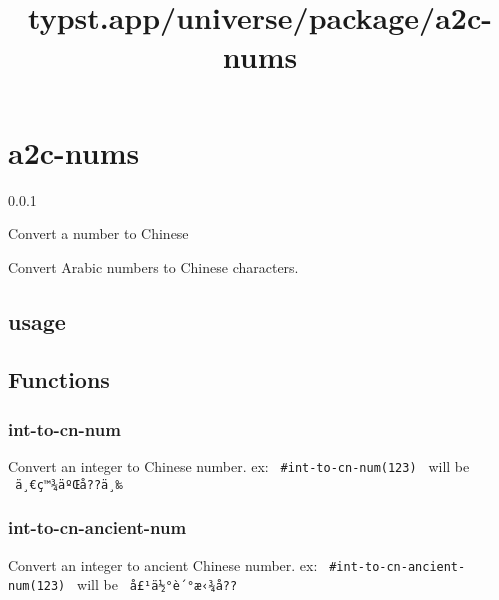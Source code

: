 \title{typst.app/universe/package/a2c-nums}

\label{banner}
\section{a2c-nums}\label{a2c-nums}

{ 0.0.1 }

Convert a number to Chinese

\label{readme}
Convert Arabic numbers to Chinese characters.

\subsection{usage}\label{usage}

\begin{Shaded}
\begin{Highlighting}[]




\end{Highlighting}
\end{Shaded}

\subsection{Functions}\label{functions}

\subsubsection{int-to-cn-num}\label{int-to-cn-num}

Convert an integer to Chinese number. ex:
\texttt{\ \#int-to-cn-num(123)\ } will be \texttt{\ ä¸€ç™¾äºŒå??ä¸‰\ }

\subsubsection{int-to-cn-ancient-num}\label{int-to-cn-ancient-num}

Convert an integer to ancient Chinese number. ex:
\texttt{\ \#int-to-cn-ancient-num(123)\ } will be
\texttt{\ å£¹ä½°è´°æ‹¾å??\ }

